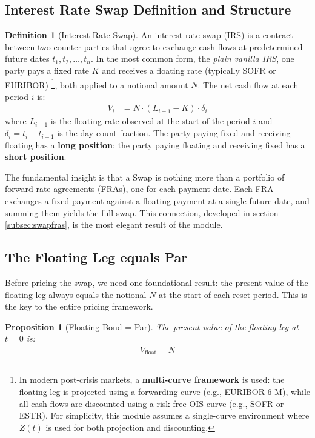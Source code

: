 \documentclass{article}
\theoremstyle{definition}  %
\newtheorem{definition}{Definition}[section]
\theoremstyle{plain}  %
\newtheorem{proposition}{Proposition}[section]
\numberwithin{definition}{section}
\numberwithin{proposition}{section}
\numberwithin{theorem}{section}
\numberwithin{equation}{section}
\begin{document}
\subsection{Interest Rate Swap Definition and Structure}

\begin{definition}[Interest Rate Swap]
    An interest rate swap (IRS) is a contract between two counter-parties that agree to exchange cash flows at predetermined future dates $t_{1}, t_{2}, \dots, t_{n}$. In the most common form, the \textit{plain vanilla IRS}, one party pays a fixed rate $K$ and receives a floating rate (typically SOFR or EURIBOR) \footnote{In modern post-crisis markets, a \textbf{multi-curve framework} is used: the floating leg is projected using a forwarding curve (e.g., EURIBOR 6 M), while all cash flows are discounted using a risk-free OIS curve (e.g., SOFR or ESTR). For simplicity, this module assumes a single-curve environment where $Z(t)$ is used for both projection and discounting.}, both applied to a notional amount $N$. The net cash flow at each period $i$ is:
    \begin{align*}
        V_{i} &= N \cdot (L_{i - 1} - K) \cdot \delta_{i}
    \end{align*}
    where $L_{i - 1}$ is the floating rate observed at the start of the period $i$ and $\delta_{i} = t_{i} - t_{i - 1}$ is the day count fraction. The party paying fixed and receiving floating has a \textbf{long position}; the party paying floating and receiving fixed has a \textbf{short position}. 
\end{definition}

The fundamental insight is that a Swap is nothing more than a portfolio of forward rate agreements (FRAs), one for each payment date. Each FRA exchanges a fixed payment against a floating payment at a single future date, and summing them yields the full swap. This connection, developed in section \ref{subsec:swapfras}, is the most elegant result of the module.

\subsection{The Floating Leg equals Par}

Before pricing the swap, we need one foundational result: the present value of the floating leg always equals the notional $N$ at the start of each reset period. This is the key to the entire pricing framework.

\begin{proposition}[Floating Bond = Par]
    The present value of the floating leg at $t = 0$ is:
    \begin{align*}
        V_{\text{float}} = N
    \end{align*}
\end{proposition}
\end{document}
